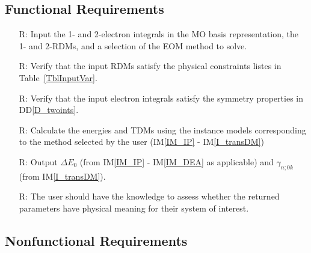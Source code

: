 \documentclass[12pt]{article}
\newcommand{\ddref}[1]{DD\ref{#1}}
\newcommand{\iref}[1]{IM\ref{#1}}
\newcounter{reqnum} %
\begin{document}
\subsection{Functional Requirements}

\noindent \begin{itemize}

\item[R\refstepcounter{reqnum}\thereqnum \label{R_Inputs}:] Input the 1- and 
2-electron integrals in the MO basis representation, the 1- and 2-RDMs, and a 
selection of the EOM method to solve.

\item[R\refstepcounter{reqnum}\thereqnum \label{R_VerifyInputs_RDM}:] Verify 
that 
the input RDMs satisfy the physical constraints listes in 
Table~\ref{TblInputVar}.

\item[R\refstepcounter{reqnum}\thereqnum \label{R_VerifyInputs_Ints}:] Verify 
that the input electron integrals satisfy the symmetry properties in 
\ddref{D_twoints}.

\item[R\refstepcounter{reqnum}\thereqnum \label{R_Calculate}:] Calculate the 
energies and TDMs using the instance models corresponding to the method 
selected by the user (\iref{IM_IP} - \iref{I_transDM})

\item[R\refstepcounter{reqnum}\thereqnum \label{R_Output}:] Output $\Delta E_0$ 
(from \iref{IM_IP} - \iref{IM_DEA} as applicable) and $\gamma_{n;0k}$ (from  
\iref{I_transDM}).

\item[R\refstepcounter{reqnum}\thereqnum \label{R_VerifyOutput}:]
The user should have the knowledge to assess whether the returned parameters 
have physical meaning for their system of interest.


\end{itemize}

\subsection{Nonfunctional Requirements}
\end{document}
